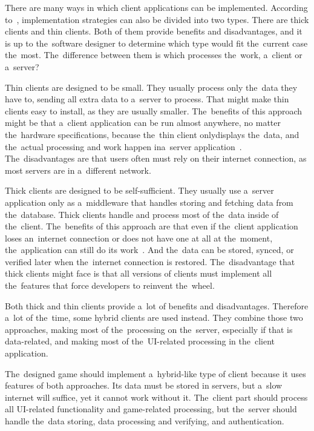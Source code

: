 There are many ways in which client applications can be implemented.
According to~\cite{a2020_difference}, implementation strategies can also be divided into two types.
There are thick clients and thin clients.
Both of them provide benefits and disadvantages, and it is up to the~software designer to determine which type would fit the~current case the~most.
The~difference between them is which processes the~work, a~client or a~server?

Thin clients are designed to be small.
They usually process only the~data they have to, sending all extra data to a~server to process.
That might make thin clients easy to install, as they are usually smaller.
The~benefits of this approach might be that a~client application can be run almost anywhere, no matter the~hardware specifications, because the~thin client only\linebreak{}displays the~data, and the~actual processing and work happen in\linebreak{}a~server application~\cite{a2020_difference}.
The~disadvantages are that users often must rely on their internet connection, as most servers are in a~different network.

Thick clients are designed to be self-sufficient.
They usually use a~server application only as a~middleware that handles storing and fetching data from the~database.  
Thick clients handle and process most of the~data inside of the~client.
The~benefits of this approach are that even if the~client application loses an~internet connection or does not have one at all at the~moment, the~application can still do its work~\cite{a2020_difference}.
And the~data can be stored, synced, or verified later when the~internet connection is restored.
The~disadvantage that thick clients might face is that all versions of clients must implement all the~features that force developers to reinvent the~wheel.

Both thick and thin clients provide a~lot of benefits and disadvantages.
Therefore a~lot of the~time, some hybrid clients are used instead.
They combine those two approaches, making most of the~processing on the~server, especially if that is data-related, and making most of the~UI-related processing in the~client application.

The~designed game should implement a~hybrid-like type of client because it uses features of both approaches.
Its data must be stored in servers, but a~slow internet will suffice, yet it cannot work without it.
The~client part should process all UI-related functionality and game-related processing, but the~server should handle the~data storing, data processing and verifying, and authentication.

